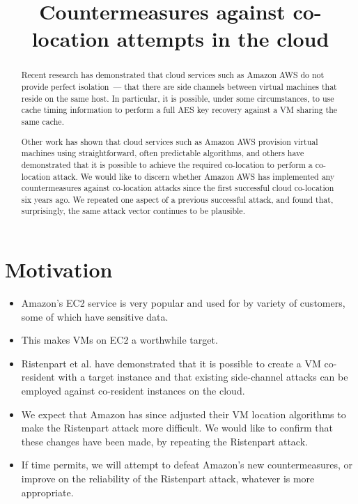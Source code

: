 \documentclass[conference]{IEEEtran}
\begin{document}
\title{Countermeasures against co-location attempts in the cloud}


\author{
}
\maketitle
\nocite{*}

\begin{abstract}
Recent research has demonstrated that cloud services such as Amazon AWS do not provide perfect isolation~--- that there
  are side channels between virtual machines that reside on the same host.
In particular, it is possible, under some circumstances, to use cache timing information to perform a full AES key
  recovery against a VM sharing the same cache.

Other work has shown that cloud services such as Amazon AWS provision virtual machines using straightforward, often
  predictable algorithms, and others have demonstrated that it is possible to achieve the required co-location to
  perform a co-location attack.
We would like to discern whether Amazon AWS has implemented any countermeasures against co-location attacks since the
  first successful cloud co-location six years ago.
We repeated one aspect of a previous successful attack, and found that, surprisingly, the same attack vector continues
  to be plausible.
\end{abstract}

\section{Motivation}

\begin{itemize}
  \item Amazon's EC2 service is very popular and used for by variety of customers, some of which have sensitive data.
  \item This makes VMs on EC2 a worthwhile target.
  \item Ristenpart et al. have demonstrated that it is possible to create a VM co-resident with a target instance and
    that existing side-channel attacks can be employed against co-resident instances on the cloud.
  \item We expect that Amazon has since adjusted their VM location algorithms to make the Ristenpart attack more
    difficult. We would like to confirm that these changes have been made, by repeating the Ristenpart attack.
  \item If time permits, we will attempt to defeat Amazon's new countermeasures, or improve on the reliability of the
    Ristenpart attack, whatever is more appropriate.
\end{itemize}
\end{document}
